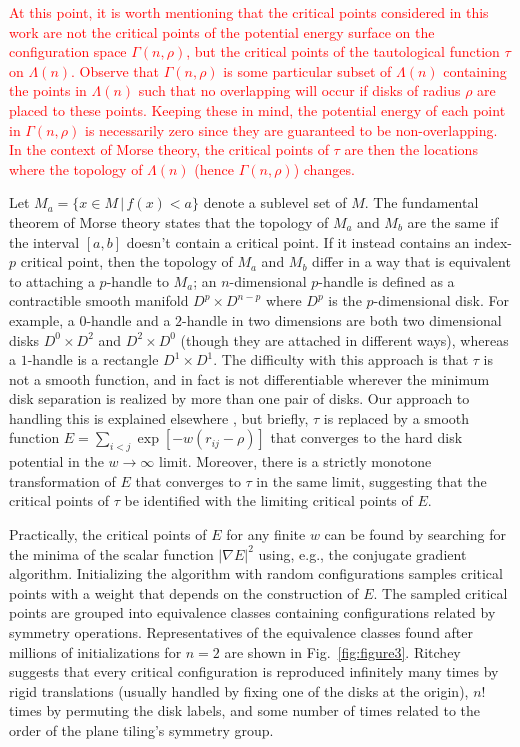 \documentclass[default,iicol]{sn-jnl}%
\theoremstyle{thmstyleone}%
\theoremstyle{thmstyletwo}%
\theoremstyle{thmstylethree}%
\providecommand{\red}[1]{\textcolor{red}{#1}}
\begin{document}
\red{At this point, it is worth mentioning that the critical points considered in this work are not the critical points of the potential energy surface on the configuration space $\Gamma(n,\rho)$, but the critical points of the tautological function $\tau$ on $\Lambda(n)$. Observe that $\Gamma(n,\rho)$ is some particular subset of $\Lambda(n)$ containing the points in $\Lambda(n)$ such that no overlapping will occur if disks of radius $\rho$ are placed to these points. Keeping these in mind, the potential energy of each point in $\Gamma(n,\rho)$ is necessarily zero since they are guaranteed to be non-overlapping. In the context of Morse theory, the critical points of $\tau$ are then the locations where the topology of $\Lambda(n)$ (hence $\Gamma(n,\rho)$) changes.}

Let $M_a = \{x \in M \,\vert\, f(x) < a\}$ denote a sublevel set of $M$. The fundamental theorem of Morse theory states that the topology of $M_a$ and $M_b$ are the same if the interval $[a, b]$ doesn't contain a critical point. If it instead contains an index-$p$ critical point, then the topology of $M_a$ and $M_b$ differ in a way that is equivalent to attaching a $p$-handle to $M_a$; an $n$-dimensional $p$-handle is defined as a contractible smooth manifold $D^{p} \times D^{n-p}$ where $D^p$ is the $p$-dimensional disk. For example, a $0$-handle and a $2$-handle in two dimensions are both two dimensional disks $D^0 \times D^2$ and $D^2 \times D^0$ (though they are attached in different ways), whereas a $1$-handle is a rectangle $D^1 \times D^1$. The difficulty with this approach is that $\tau$ is not a smooth function, and in fact is not differentiable wherever the minimum disk separation is realized by more than one pair of disks. Our approach to handling this is explained elsewhere \cite{ritcheyphd}, but briefly, $\tau$ is replaced by a smooth function $E = \sum_{i < j} \exp[-w(r_{ij} - \rho)]$ that converges to the hard disk potential in the $w \rightarrow \infty$ limit. Moreover, there is a strictly monotone transformation of $E$ that converges to $\tau$ in the same limit, suggesting that the critical points of $\tau$ be identified with the limiting critical points of $E$.

Practically, the critical points of $E$ for any finite $w$ can be found by searching for the minima of the scalar function $\lvert\nabla E\rvert^2$ using, e.g., the conjugate gradient algorithm. Initializing the algorithm with random configurations samples critical points with a weight that depends on the construction of $E$. The sampled critical points are grouped into equivalence classes containing configurations related by symmetry operations. Representatives of the equivalence classes found after millions of initializations for $n = 2$ are shown in Fig.\ \ref{fig:figure3}. Ritchey \cite{ritcheyphd} suggests that every critical configuration is reproduced infinitely many times by rigid translations (usually handled by fixing one of the disks at the origin), $n!$ times by permuting the disk labels, and some number of times related to the order of the plane tiling's symmetry group.
\end{document}
